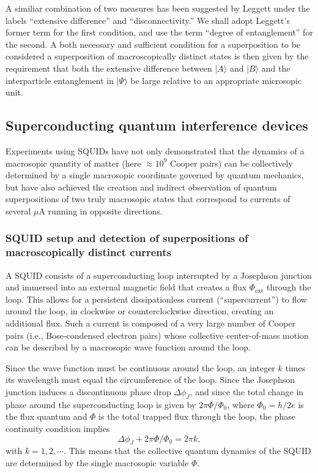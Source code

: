 \documentclass[12pt,aps,floatfix,amsmath,amssymb,showpacs,nofootinbib]{revtex4-2}
\newcommand{\be}{\begin{equation}} \newcommand{\ee}{\end{equation}}
\newcommand{\ket}[1]{\ensuremath{|{#1\rangle}}}
\begin{document}
\en

A similiar combination of two measures has been suggested by Leggett
\cite{Leggett:1980:yt,Leggett:2002:uy} under the labels ``extensive
difference'' and ``disconnectivity.'' We shall adopt Leggett's former
term for the first condition, and use the term ``degree of
entanglement'' for the second. A both necessary and sufficient
condition for a superposition to be considered a superposition of
macroscopically distinct states is then given by the requirement that
both the extensive difference between $\ket{A}$ and $\ket{B}$ and the
interparticle entanglement in $\ket{\Psi}$ be large relative to an
appropriate microsopic unit.
 

\subsection{Superconducting quantum interference
  devices} \label{sec:squid}

Experiments using SQUIDs have not only demonstrated that the dynamics
of a macrosopic quantity of matter (here $\approx 10^9$ Cooper pairs)
can be collectively determined by a single macrosopic coordinate
governed by quantum mechanics, but have also achieved the creation and
indirect observation of quantum superpositions of two truly macrosopic
states that correspond to currents of several $\mu$A running in
opposite directions.

\subsubsection{SQUID setup and detection of superpositions of
  macroscopically distinct currents}

A SQUID consists of a superconducting loop interrupted by a Josephson
junction and immersed into an external magnetic field that creates a
flux $\Phi_\text{ext}$ through the loop. This allows for a persistent
dissipationless current (``supercurrent'') to flow around the loop, in
clockwise or counterclockwise direction, creating an additional flux.
Such a current is composed of a very large number of Cooper pairs
(i.e., Bose-condensed electron pairs) whose collective center-of-mass
motion can be described by a macrosopic wave function around the loop.

Since the wave function must be continuous around the loop, an integer
$k$ times its wavelength must equal the circumference of the loop.
Since the Josephson junction induces a discontinuous phase drop
$\Delta \phi_J$, and since the total change in phase around the
superconducting loop is given by $2\pi\Phi/\Phi_0$, where
$\Phi_0=h/2e$ is the flux quantum and $\Phi$ is the total trapped flux
through the loop, the phase continuity condition implies
%
\be
\Delta \phi_J + 2\pi \Phi/\Phi_0 = 2\pi k,
\ee
%
with $k=1,2,\cdots$. This means that the collective quantum dynamics
of the SQUID are determined by the single macrosopic variable
$\Phi$.
\end{document}
